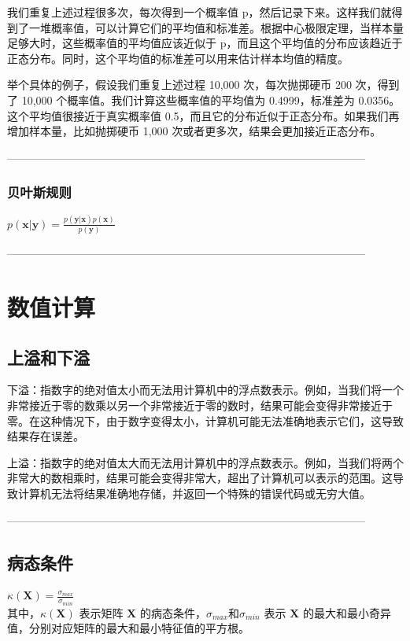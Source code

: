 \documentclass{article}
\begin{document}
我们重复上述过程很多次，每次得到一个概率值 p，然后记录下来。这样我们就得到了一堆概率值，可以计算它们的平均值和标准差。根据中心极限定理，当样本量足够大时，这些概率值的平均值应该近似于 p，而且这个平均值的分布应该趋近于正态分布。同时，这个平均值的标准差可以用来估计样本均值的精度。

举个具体的例子，假设我们重复上述过程 10,000 次，每次抛掷硬币 200 次，得到了 10,000 个概率值。我们计算这些概率值的平均值为 0.4999，标准差为 0.0356。这个平均值很接近于真实概率值 0.5，而且它的分布近似于正态分布。如果我们再增加样本量，比如抛掷硬币 1,000 次或者更多次，结果会更加接近正态分布。


--------------------------------------------------------------------------------------------------
\subsubsection{贝叶斯规则}
$ p(\mathbf{x} | \mathbf{y}) = \frac{p(\mathbf{y} | \mathbf{x})p(\mathbf{x})}{p(\mathbf{y})} $

--------------------------------------------------------------------------------------------------

\section{数值计算}
\subsection{上溢和下溢}

下溢：指数字的绝对值太小而无法用计算机中的浮点数表示。例如，当我们将一个非常接近于零的数乘以另一个非常接近于零的数时，结果可能会变得非常接近于零。在这种情况下，由于数字变得太小，计算机可能无法准确地表示它们，这导致结果存在误差。

上溢：指数字的绝对值太大而无法用计算机中的浮点数表示。例如，当我们将两个非常大的数相乘时，结果可能会变得非常大，超出了计算机可以表示的范围。这导致计算机无法将结果准确地存储，并返回一个特殊的错误代码或无穷大值。

--------------------------------------------------------------------------------------------------
\subsection{病态条件}
$ \kappa(\mathbf{X}) = \frac{\sigma_{max}}{\sigma_{min}} $  \\
其中，$ \kappa(\mathbf{X}) $ 表示矩阵 $\mathbf{X}$ 的病态条件，$\sigma_{max}​$和$\sigma_{min}​$ 表示 $\mathbf{X}$ 的最大和最小奇异值，分别对应矩阵的最大和最小特征值的平方根。
\end{document}
